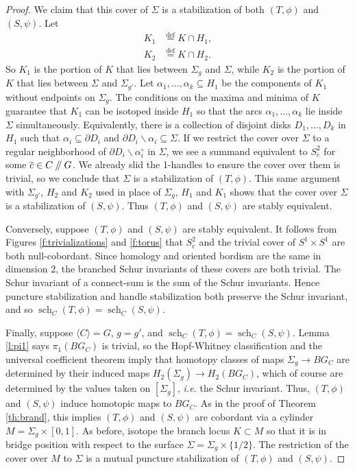 \documentclass[10pt,twocolumn,amsmath,amssymb,aps,pra,secnumarabic,
    nofootinbib,groupedaddress]{revtex4-1}
\newcommand{\defeq}{\stackrel{\mathrm{def}}=}
\renewcommand{\setminus}{\smallsetminus}
\newcommand{\sslash}{\mathbin{/\mkern-5mu/}}
\newcommand{\sch}{\operatorname{sch}}
\begin{document}
\begin{proof}
We claim that this cover of $\Sigma$ is a stabilization of both $(T,\phi)$ and $(S,\psi)$.  Let
\[\begin{aligned}
K_1 &\defeq K \cap H_1, \\
K_2 &\defeq K \cap H_2.
\end{aligned}\]
So $K_1$ is the portion of $K$ that lies between $\Sigma_g$ and $\Sigma$, while $K_2$ is the portion of $K$ that lies between $\Sigma$ and $\Sigma_{g'}$.  Let $\alpha_1,\dots,\alpha_k \subseteq H_1$ be the components of $K_1$ without endpoints on $\Sigma_g$.  The conditions on the maxima and minima of $K$ guarantee that $K_1$ can be isotoped inside $H_1$ so that the arcs $\alpha_1,\dots,\alpha_k$ lie inside $\Sigma$ simultaneously.  Equivalently, there is a collection of disjoint disks $D_1,\dots,D_k$ in $H_1$ such that $\alpha_i \subseteq \partial D_i$ and $\partial D_i \setminus \alpha_i \subseteq \Sigma$.  If we restrict the cover over $\Sigma$ to a regular neighborhood of $\partial D_i \setminus \alpha_i^\circ$ in $\Sigma$, we see a summand equivalent to $S^2_{\overline{c}}$ for some $\overline{c} \in C\sslash G$.  We already slid the 1-handles to ensure the cover over them is trivial, so we conclude that $\Sigma$ is a stabilization of $(T,\phi)$.  This same argument with $\Sigma_{g'}$, $H_2$ and $K_2$ used in place of $\Sigma_g$, $H_1$ and $K_1$ shows that the cover over $\Sigma$ is a stabilization of $(S,\psi)$.  Thus $(T,\phi)$ and $(S,\psi)$ are stably equivalent.

Conversely, suppose $(T,\phi)$ and $(S,\psi)$ are stably equivalent.  It follows from Figures \ref{f:trivializations} and \ref{f:torus} that $S^2_{\overline{c}}$ and the trivial cover of $S^1 \times S^1$ are both null-cobordant.  Since homology and oriented bordism are the same in dimension 2, the branched Schur invariants of these covers are both trivial.  The Schur invariant of a connect-sum is the sum of the Schur invariants.  Hence puncture stabilization and handle stabilization both preserve the Schur invariant, and so $\sch_C(T,\phi) = \sch_C(S,\psi)$.

Finally, suppose $\langle C \rangle = G$, $g=g'$, and $\sch_C(T,\phi) = \sch_C(S,\psi)$.  Lemma \ref{l:pi1} says $\pi_1(BG_C)$ is trivial, so the Hopf-Whitney classification \cite[Corollary V.6.19]{Whitehead:homotopyGTM} and the universal coefficient theorem imply that homotopy classes of maps $\Sigma_g \to BG_C$ are determined by their induced maps $H_2(\Sigma_g) \to H_2(BG_C)$, which of course are determined by the values taken on $[\Sigma_g]$, \emph{i.e.} the Schur invariant.  Thus, $(T,\phi)$ and $(S,\psi)$ induce homotopic maps to $BG_C$.  As in the proof of Theorem \ref{th:brand}, this implies $(T,\phi)$ and $(S,\psi)$ are cobordant via a cylinder $M = \Sigma_g \times [0,1]$.  As before, isotope the branch locus $K \subset M$ so that it is in bridge position with respect to the surface $\Sigma = \Sigma_g \times \{1/2\}$.  The restriction of the cover over $M$ to $\Sigma$ is a mutual puncture stabilization of $(T,\phi)$ and $(S,\psi)$.
\end{proof}
\end{document}
